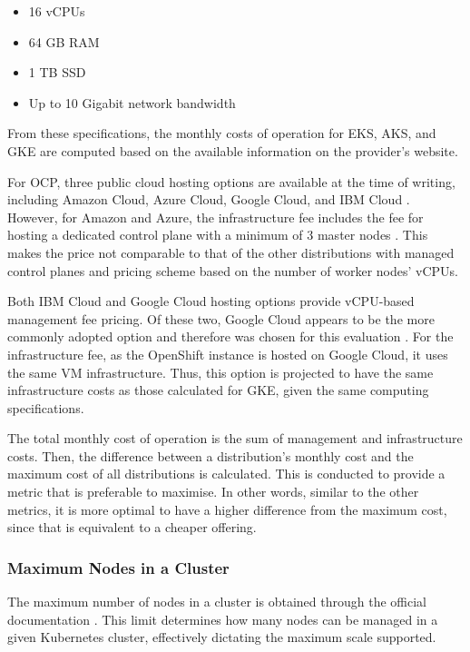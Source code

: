 \begin{itemize}
\tightlist
\item
  16 vCPUs
\item
  64 GB RAM
\item
  1 TB SSD
\item
  Up to 10 Gigabit network bandwidth
\end{itemize}

From these specifications, the monthly costs of operation for EKS, AKS, and GKE are computed
based on the available information on the provider's website. 

For OCP, three public cloud hosting options are available at the time of writing, including Amazon Cloud, Azure Cloud, Google Cloud, and IBM Cloud \cite{RedHatOpenShift}. However, for Amazon and Azure, the infrastructure fee includes the fee for hosting a dedicated control plane with a minimum of 3 master nodes \cite{RedHatOpenShiftc,PricingAzureRed}. This makes the price not comparable to that of the other distributions with managed control planes and pricing scheme based on the number of worker nodes' vCPUs.

Both IBM Cloud and Google Cloud hosting options provide vCPU-based management fee pricing. Of these two, Google Cloud appears to be the more commonly adopted option and therefore was chosen for this evaluation \cite{portworxKubernetesAdoptionSurvey2021}. For the infrastructure fee, as the OpenShift instance is hosted on Google Cloud, it uses the same VM infrastructure. Thus, this option is projected to have the same infrastructure costs as those calculated for GKE, given the same computing specifications.

The total monthly cost of operation is the sum of management and infrastructure costs. Then, the difference between a distribution's monthly cost and the maximum cost of all distributions is calculated. This is conducted to provide a metric that is preferable to maximise. In other words, similar to the other metrics, it is more optimal to have a higher difference from the maximum cost, since that is equivalent to a cheaper offering.

\subsubsection{Maximum Nodes in a Cluster}\label{maximum-nodes-in-a-cluster}

The maximum number of nodes in a cluster is obtained through the
official documentation
\cite{Chapter4Planninga,KnownLimitsService,nickomangLimitsResourcesSKUs2024,QuotasLimitsGoogle}. This limit determines how many nodes can be managed in a given Kubernetes cluster, effectively dictating the maximum scale supported.


